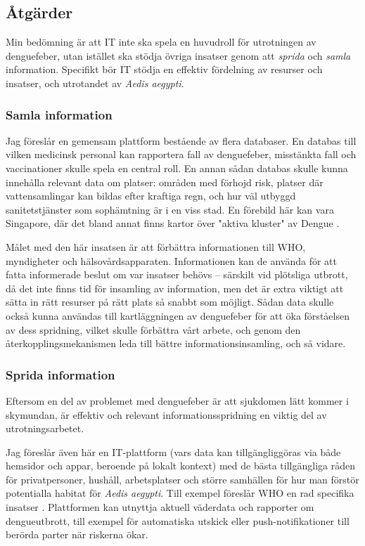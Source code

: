 \documentclass{article}
\begin{document}
\subsection{Åtgärder}

Min bedömning är att IT inte ska spela en huvudroll för utrotningen av denguefeber, utan istället ska stödja övriga insatser genom att \emph{sprida} och \emph{samla} information. Specifikt bör IT stödja en effektiv fördelning av resurser och insatser, och utrotandet av \emph{Aedis aegypti}.

\subsubsection{Samla information}

Jag föreslår en gemensam plattform bestående av flera databaser. En databas till vilken medicinsk personal kan rapportera fall av denguefeber, misstänkta fall och vaccinationer skulle spela en central roll. En annan sådan databas skulle kunna innehålla relevant data om platser: områden med förhojd risk, platser där vattensamlingar kan bildas efter kraftiga regn, och hur väl utbyggd sanitetstjänster som sophämtning är i en viss stad. En förebild här kan vara Singapore, där det bland annat finns kartor över "aktiva kluster" av Dengue .

Målet med den här insatsen är att förbättra informationen till WHO, myndigheter och hälsovårds\-apparaten. Informationen kan de använda för att fatta informerade beslut om var insatser behövs – särskilt vid plötsliga utbrott, då det inte finns tid för insamling av information, men det är extra viktigt att sätta in rätt resurser på rätt plats så snabbt som möjligt. Sådan data skulle också kunna användas till kartläggningen av denguefeber för att öka förståelsen av dess spridning, vilket skulle förbättra vårt arbete, och genom den återkopplingsmekanismen leda till bättre informationsinsamling, och så vidare.

\subsubsection{Sprida information}

Eftersom en del av problemet med denguefeber är att sjukdomen lätt kommer i skymundan, är effektiv och relevant informationsspridning en viktig del av utrotningsarbetet.

Jag föreslår även här en IT-plattform (vars data kan tillgängliggöras via både hemsidor och appar, beroende på lokalt kontext) med de bästa tillgängliga råden för privatpersoner, hushåll, arbetsplatser och större samhällen för hur man förstör potentialla habitat för \emph{Aedis aegypti}. Till exempel föreslår WHO en rad specifika insatser . Plattformen kan utnyttja aktuell väderdata och rapporter om dengueutbrott, till exempel för automatiska utskick eller push-notifikationer till berörda parter när riskerna ökar.
\end{document}
